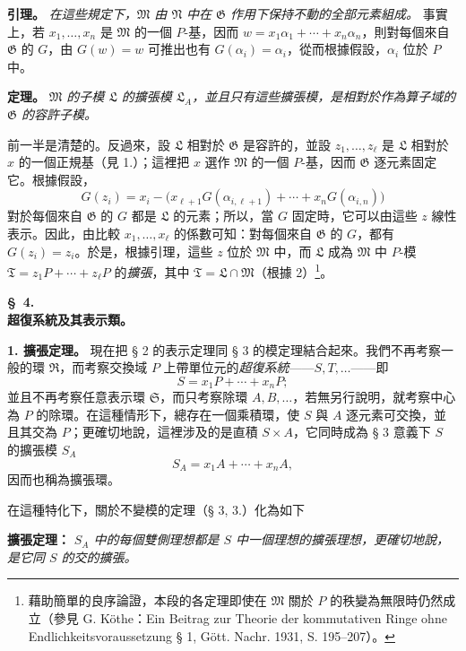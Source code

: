 \documentclass[11pt]{article}
\providecommand{\frR}{\mathfrak R}
\providecommand{\frS}{\mathfrak S}
\providecommand{\frT}{\mathfrak T}
\providecommand{\frM}{\mathfrak M}
\providecommand{\frN}{\mathfrak N}
\providecommand{\frG}{\mathfrak G}
\providecommand{\frL}{\mathfrak L}
\begin{document}
\noindent\textbf{引理。} \emph{在這些規定下，\(\frM\) 由 \(\frN\) 中在 \(\frG\) 作用下保持不動的全部元素組成。} 事實上，若 \(x_1,\ldots,x_n\) 是 \(\frM\) 的一個 \(P\)-基，因而 \(w=x_1\alpha_1+\cdots+x_n\alpha_n\)，則對每個來自 \(\frG\) 的 \(G\)，由 \(G(w)=w\) 可推出也有 \(G(\alpha_i)=\alpha_i\)，從而根據假設，\(\alpha_i\) 位於 \(P\) 中。

\noindent\textbf{定理。} \emph{\(\frM\) 的子模 \(\frL\) 的擴張模 \(\frL_A\)，並且只有這些擴張模，是相對於作為算子域的 \(\frG\) 的容許子模。}

前一半是清楚的。反過來，設 \(\frL\) 相對於 \(\frG\) 是容許的，並設 \(z_1,\ldots,z_\ell\) 是 \(\frL\) 相對於 \(x\) 的一個正規基（見 1.）；這裡把 \(x\) 選作 \(\frM\) 的一個 \(P\)-基，因而 \(\frG\) 逐元素固定它。根據假設，
\[
        G(z_i)=x_i-\bigl(x_{\ell+1}G(\alpha_{i,\ell+1})
              +\cdots+x_nG(\alpha_{i,n})\bigr)
\]
對於每個來自 \(\frG\) 的 \(G\) 都是 \(\frL\) 的元素；所以，當 \(G\) 固定時，它可以由這些 \(z\) 線性表示。因此，由比較 \(x_1,\ldots,x_\ell\) 的係數可知：對每個來自 \(\frG\) 的 \(G\)，都有 \(G(z_i)=z_i\)。於是，根據引理，這些 \(z\) 位於 \(\frM\) 中，而 \(\frL\) 成為 \(\frM\) 中 \(P\)-模 \(\frT=z_1P+\cdots+z_\ell P\) 的\emph{擴張}，其中 \(\frT=\frL\cap\frM\)（根據 2）\footnote{藉助簡單的良序論證，本段的各定理即使在 \(\frM\) 關於 \(P\) 的秩變為無限時仍然成立（參見 G. Köthe：Ein Beitrag zur Theorie der kommutativen Ringe ohne Endlichkeitsvoraussetzung § 1, Gött. Nachr. 1931, S. 195--207）。}。

\begin{center}
\textbf{\S\ 4.}\\[0.5em]
\textbf{超復系統及其表示類。}
\end{center}

\noindent\textbf{1. 擴張定理。} 現在把 § 2 的表示定理同 § 3 的模定理結合起來。我們不再考察一般的環 \(\frR\)，而考察交換域 \(P\) 上帶單位元的\emph{超復系統}——\(S,T,\ldots\)——即
\[
        S=x_1P+\cdots+x_nP;
\]
並且不再考察任意表示環 \(\frS\)，而只考察除環 \(A,B,\ldots\)，若無另行說明，就考察中心為 \(P\) 的除環。在這種情形下，總存在一個乘積環，使 \(S\) 與 \(A\) 逐元素可交換，並且其交為 \(P\)；更確切地說，這裡涉及的是直積 \(S\times A\)，它同時成為 § 3 意義下 \(S\) 的擴張模 \(S_A\)
\[
        S_A=x_1A+\cdots+x_nA,
\]
因而也稱為擴張環。

在這種特化下，關於不變模的定理（§ 3, 3.）化為如下

\noindent\textbf{擴張定理：} \emph{\(S_A\) 中的每個雙側理想都是 \(S\) 中一個理想的擴張理想，更確切地說，是它同 \(S\) 的交的擴張。}
\end{document}
